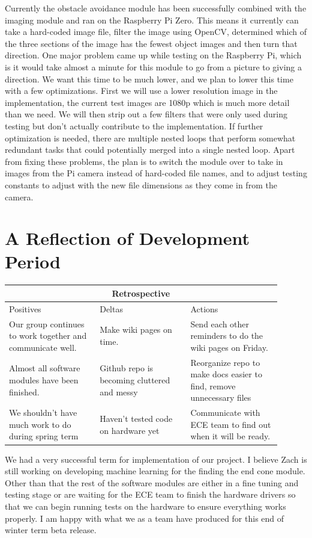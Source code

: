 \documentclass[10pt,letterpaper,onecolumn,draftclsnofoot,journal]{IEEEtran}
\begin{document}
\par
Currently the obstacle avoidance module has been successfully combined with the imaging module and ran on the Raspberry Pi Zero. This means it currently can take a hard-coded image file, filter the image using OpenCV, determined which of the three sections of the image has the fewest object images and then turn that direction. One major problem came up while testing on the Raspberry Pi, which is it would take almost a minute for this module to go from a picture to giving a direction. We want this time to be much lower, and we plan to lower this time with a few optimizations. First we will use a lower resolution image in the implementation, the current test images are 1080p which is much more detail than we need. We will then strip out a few filters that were only used during testing but don't actually contribute to the implementation. If further optimization is needed, there are multiple nested loops that perform somewhat redundant tasks that could potentially merged into a single nested loop. Apart from fixing these problems, the plan is to switch the module over to take in images from the Pi camera instead of hard-coded file names, and to adjust testing constants to adjust with the new file dimensions as they come in from the camera.

\section{A Reflection of Development Period}
\begin{tabular}{ |p{0.3\linewidth}|p{0.3\linewidth}|p{0.3\linewidth}|  }
	\hline
	\multicolumn{3}{|c|}{Retrospective} \\
	\hline
	Positives& Deltas &Actions \\
	\hline
	Our group continues to work together and communicate well. &
	Make wiki pages on time.&
	Send each other reminders to do the wiki pages on Friday. \\
	
	Almost all software modules have been finished. &
	Github repo is becoming cluttered and messy &
	Reorganize repo to make docs easier to find, remove unnecessary files \\
	
	We shouldn't have much work to do during spring term &
	Haven't tested code on hardware yet & Communicate with ECE team to find out when it will be ready.  \\
	\hline
\end{tabular}
\vspace{1cm}
\par
We had a very successful term for implementation of our project. I believe Zach is still working on developing  machine learning for the finding the end cone module. Other than that the rest of the software modules are either in a fine tuning and testing stage or are waiting for the ECE team to finish the hardware drivers so that we can begin running tests on the hardware to ensure everything works properly. I am happy with what we as a team have produced for this end of winter term beta release.
\end{document}
